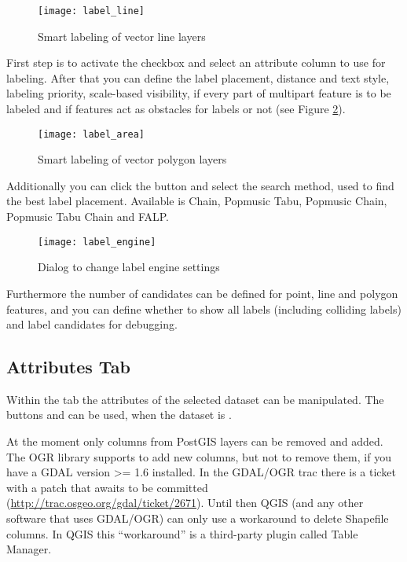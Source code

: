 \begin{figure}[ht]
\centering
   \texttt{[image: label\_line]}
   \caption{Smart labeling of vector line layers \nixcaption}\label{fig:linelabel}
\end{figure}


First step is to activate the  checkbox and select an attribute
column to use for labeling. After that you can define the label placement, distance and text
style, labeling priority, scale-based visibility, if every part of multipart feature is to be
labeled and if features act as obstacles for labels or not (see Figure \ref{fig:arealabel}).

\begin{figure}[ht]
\centering
   \texttt{[image: label\_area]}
   \caption{Smart labeling of vector polygon layers \nixcaption}\label{fig:arealabel}
\end{figure}


Additionally you can click the  button and select the search method,
used to find the best label placement. Available is Chain, Popmusic Tabu, Popmusic Chain,
Popmusic Tabu Chain and FALP.

\begin{figure}[ht]
\centering
   \texttt{[image: label\_engine]}
   \caption{Dialog to change label engine settings \nixcaption}\label{fig:labelengine}
\end{figure}

Furthermore the number of candidates can be defined for point, line and polygon features,
and you can define whether to show all labels (including colliding labels) and label
candidates for debugging.

\subsection{Attributes Tab}\label{label_attributes}

Within the  tab the attributes of the selected dataset can be
manipulated. The buttons  and
 can be
used, when the dataset is .

At the moment only columns from PostGIS layers can be removed and added. The
OGR library supports to add new columns, but not to remove them, if you have
a GDAL version >= 1.6 installed.  In the GDAL/OGR trac there is a ticket with a patch that
awaits to be committed (\url{http://trac.osgeo.org/gdal/ticket/2671}). Until then QGIS
(and any other software that uses GDAL/OGR) can only use a workaround to delete
Shapefile columns. In QGIS this ``workaround'' is a third-party plugin called
Table Manager.

